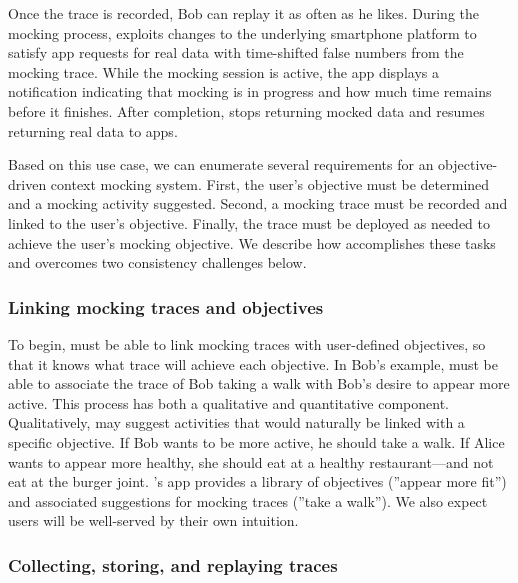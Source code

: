 Once the trace is recorded, Bob can replay it as often as he likes. During the
mocking process, \PocketMocker{} exploits changes to the underlying
smartphone platform to satisfy app requests for real data with time-shifted
false numbers from the mocking trace. While the mocking session is active, the
\PocketMocker{} app displays a notification indicating that mocking is in
progress and how much time remains before it finishes. After completion,
\PocketMocker{} stops returning mocked data and resumes returning real data to
apps.

Based on this use case, we can enumerate several requirements for an
objective-driven context mocking system. First, the user's objective must be
determined and a mocking activity suggested. Second, a mocking trace must be
recorded and linked to the user's objective. Finally, the trace must be
deployed as needed to achieve the user's mocking objective. We describe how
\PocketMocker{} accomplishes these tasks and overcomes two consistency
challenges below.

\subsubsection{Linking mocking traces and objectives}

To begin, \PocketMocker{} must be able to link mocking traces with
user-defined objectives, so that it knows what trace will achieve each
objective. In Bob's example, \PocketMocker{} must be able to associate the
trace of Bob taking a walk with Bob's desire to appear more active. This
process has both a qualitative and quantitative component. Qualitatively,
\PocketMocker{} may suggest activities that would naturally be linked with a
specific objective. If Bob wants to be more active, he should take a walk. If
Alice wants to appear more healthy, she should eat at a healthy
restaurant---and not eat at the burger joint. \PocketMocker{}'s app
provides a library of objectives (''appear more fit'') and associated
suggestions for mocking traces (''take a walk''). We also expect users will
be well-served by their own intuition.

\subsubsection{Collecting, storing, and replaying traces}

